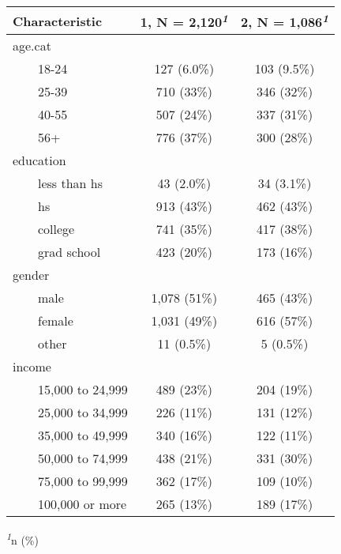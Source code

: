 \setlength{\LTpost}{0mm}
\begin{longtable}{lcc}
\toprule
\textbf{Characteristic} & \textbf{1}, N = 2,120\textsuperscript{\textit{1}} & \textbf{2}, N = 1,086\textsuperscript{\textit{1}} \\ 
\midrule\addlinespace[2.5pt]
age.cat &  &  \\ 
    18-24 & 127 (6.0\%) & 103 (9.5\%) \\ 
    25-39 & 710 (33\%) & 346 (32\%) \\ 
    40-55 & 507 (24\%) & 337 (31\%) \\ 
    56+ & 776 (37\%) & 300 (28\%) \\ 
education &  &  \\ 
    less than hs & 43 (2.0\%) & 34 (3.1\%) \\ 
    hs & 913 (43\%) & 462 (43\%) \\ 
    college & 741 (35\%) & 417 (38\%) \\ 
    grad school & 423 (20\%) & 173 (16\%) \\ 
gender &  &  \\ 
    male & 1,078 (51\%) & 465 (43\%) \\ 
    female & 1,031 (49\%) & 616 (57\%) \\ 
    other & 11 (0.5\%) & 5 (0.5\%) \\ 
income &  &  \\ 
    15,000 to 24,999 & 489 (23\%) & 204 (19\%) \\ 
    25,000 to 34,999 & 226 (11\%) & 131 (12\%) \\ 
    35,000 to 49,999 & 340 (16\%) & 122 (11\%) \\ 
    50,000 to 74,999 & 438 (21\%) & 331 (30\%) \\ 
    75,000 to 99,999 & 362 (17\%) & 109 (10\%) \\ 
    100,000 or more & 265 (13\%) & 189 (17\%) \\ 
\bottomrule
\end{longtable}
\begin{minipage}{\linewidth}
\textsuperscript{\textit{1}}n (\%)\\
\end{minipage}

